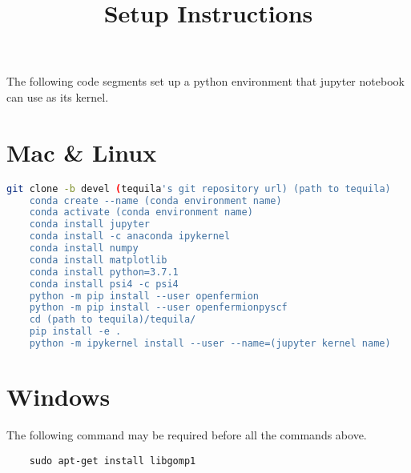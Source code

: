 \documentclass[12pt]{article}
\title{Setup Instructions}
\date{}
\begin{document}
\maketitle

The following code segments set up a python environment that jupyter notebook can use as its kernel. 

\section*{Mac \& Linux}

\begin{lstlisting}[language=bash, breaklines=true]
    git clone -b devel (tequila's git repository url) (path to tequila)
    conda create --name (conda environment name)
    conda activate (conda environment name)
    conda install jupyter
    conda install -c anaconda ipykernel
    conda install numpy
    conda install matplotlib
    conda install python=3.7.1
    conda install psi4 -c psi4
    python -m pip install --user openfermion
    python -m pip install --user openfermionpyscf
    cd (path to tequila)/tequila/
    pip install -e .
    python -m ipykernel install --user --name=(jupyter kernel name)
\end{lstlisting}

\section*{Windows}
The following command may be required before all the commands above. 
\begin{lstlisting}
    sudo apt-get install libgomp1
\end{lstlisting}
\end{document}
